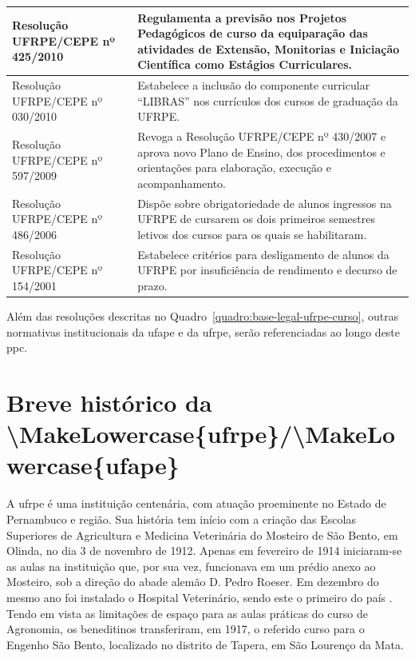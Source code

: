 \documentclass[
	12pt,				%
	openright,			%
  oneside,     %
	a4paper,			%
 hyphens,
	chapter=TITLE,		%
	english,			%
	french,				%
	spanish,			%
	brazil				%
	]{abntex2}
\begin{document}
\begin{center}
\begin{scriptsize}
\begin{longtable}{p{5.8cm}p{9cm}}
    Resolução UFRPE/CEPE nº 425/2010 &	Regulamenta a previsão nos Projetos Pedagógicos de curso da equiparação das atividades de Extensão, Monitorias e Iniciação Científica como Estágios Curriculares. \\ \midrule
    Resolução UFRPE/CEPE nº 030/2010 & Estabelece a inclusão do componente curricular ``LIBRAS'' nos 	currículos dos cursos de graduação da UFRPE. \\ \midrule
    Resolução UFRPE/CEPE nº 597/2009 & Revoga a Resolução UFRPE/CEPE nº 430/2007 e aprova novo Plano de Ensino, dos 	procedimentos e orientações para elaboração, execução e acompanhamento. \\ \midrule
    Resolução UFRPE/CEPE nº 486/2006 & Dispõe sobre obrigatoriedade de alunos ingressos na UFRPE de cursarem os dois primeiros semestres letivos dos cursos para os quais se habilitaram. \\ \midrule
    Resolução UFRPE/CEPE nº 154/2001 & Estabelece critérios para desligamento de alunos da UFRPE por insuficiência de rendimento e decurso de prazo. \\     
    \bottomrule
    \end{longtable}
\end{scriptsize}     
\end{center}

Além das resoluções descritas no Quadro~\ref{quadro:base-legal-ufrpe-curso}, outras normativas institucionais da \acrshort{ufape} e da \acrshort{ufrpe}, serão referenciadas ao longo deste \acrshort{ppc}.



\chapter{Breve histórico da \acrshort{\MakeLowercase{ufrpe}}/\acrshort{\MakeLowercase{ufape}}}

A \acrlong{ufrpe} é uma instituição centenária, com atuação proeminente no Estado de Pernambuco e região. Sua história tem início com a criação das Escolas Superiores de Agricultura e Medicina Veterinária do Mosteiro de São Bento, em Olinda, no dia 3 de novembro de 1912. Apenas em fevereiro de 1914 iniciaram-se as aulas na instituição que, por sua vez, funcionava em um prédio anexo ao Mosteiro, sob a direção do abade alemão D. Pedro Roeser. Em dezembro do mesmo ano foi instalado o Hospital Veterinário, sendo este o primeiro do país \cite{melo2010alveitares}. Tendo em vista as limitações de espaço para as aulas práticas do curso de Agronomia, os beneditinos transferiram, em 1917, o referido curso para o Engenho São Bento, localizado no distrito de Tapera, em São Lourenço da Mata.
\end{document}
